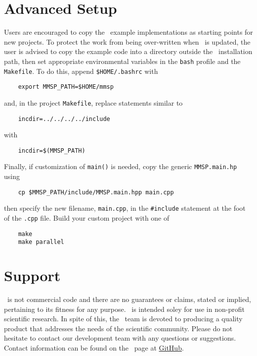 \section{Advanced Setup}
Users are encouraged to copy the \MMSP\ example implementations as starting points for new projects.  To protect the work from being over-written when \MMSP\ is updated, the user is advised to copy the example code into a directory outside the \MMSP\ installation path, then set appropriate environmental variables in the {\tt bash} profile and the {\tt Makefile}.  To do this, append {\tt \$HOME/.bashrc} with
\begin{shadebox}
\begin{verbatim}
    export MMSP_PATH=$HOME/mmsp
\end{verbatim}
\end{shadebox}
and, in the project {\tt Makefile}, replace statements similar to 
\begin{shadebox}
\begin{verbatim}
    incdir=../../../../include
\end{verbatim}
\end{shadebox}
with
\begin{shadebox}
\begin{verbatim}
    incdir=$(MMSP_PATH)
\end{verbatim}
\end{shadebox}
Finally, if customization of {\tt main()} is needed, copy the generic {\tt MMSP.main.hp} using
\begin{shadebox}
\begin{verbatim}
    cp $MMSP_PATH/include/MMSP.main.hpp main.cpp
\end{verbatim}
\end{shadebox}
then specify the new filename, {\tt main.cpp}, in the {\tt \#include} statement at the foot of the {\tt .cpp} file.  Build your custom project with one of
\begin{shadebox}
\begin{verbatim}
    make
    make parallel
\end{verbatim}
\end{shadebox}

\section{Support}
\MMSP\ is not commercial code and there are no guarantees or claims, stated or implied, pertaining to its fitness for any purpose.  \MMSP\ is intended soley for use in non-profit scientific research.  In spite of this, the \MMSP\ team is devoted to producing a quality product that addresses the needs of the scientific community.  Please do not hesitate to contact our development team with any questions or suggestions.  Contact information can be found on the \MMSP\ page at \href{https://github.com/mesoscale}{GitHub}.

